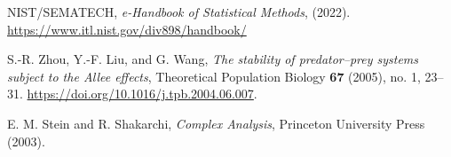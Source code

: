 \documentclass[11pt,reqno]{amsart}
\numberwithin{equation}{section}
\theoremstyle{plain}
\begin{document}
\begin{thebibliography}{ABGM19}
NIST/SEMATECH, \emph{e-Handbook of Statistical Methods}, (2022). 
\href{https://www.itl.nist.gov/div898/handbook/}{https://www.itl.nist.gov/div898/handbook/}

S.-R. Zhou, Y.-F. Liu, and G. Wang, \emph{The stability of predator–prey systems subject to the Allee effects}, Theoretical Population Biology \textbf{67} (2005), no. 1, 23--31. \href{https://doi.org/10.1016/j.tpb.2004.06.007}{https://doi.org/10.1016/j.tpb.2004.06.007}.


E. M. Stein and R. Shakarchi, \emph{Complex Analysis}, Princeton University Press (2003).

\end{thebibliography}


\ \\
\end{document}
